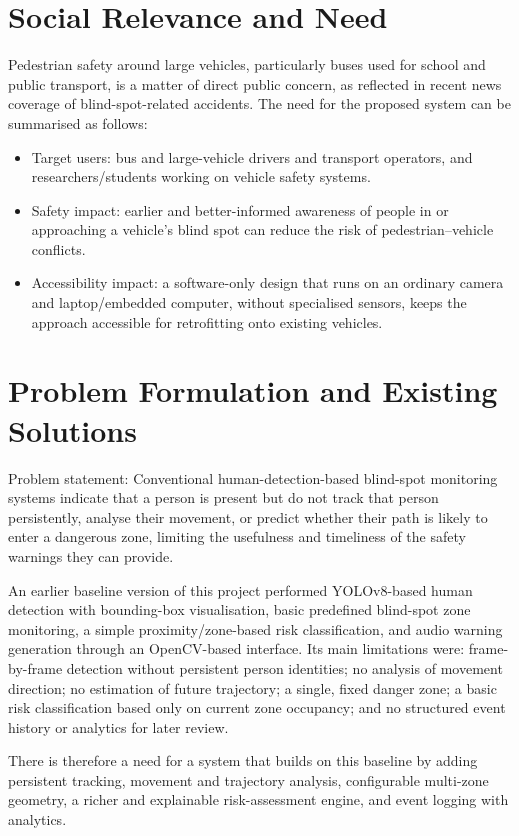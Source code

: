 \documentclass[12pt,a4paper]{report}
\begin{document}
\section{Social Relevance and Need}
Pedestrian safety around large vehicles, particularly buses used for school and public transport, is a matter of direct public concern, as reflected in recent news coverage of blind-spot-related accidents. The need for the proposed system can be summarised as follows:
\begin{itemize}[leftmargin=*,itemsep=2pt]
\item Target users: bus and large-vehicle drivers and transport operators, and researchers/students working on vehicle safety systems.
\item Safety impact: earlier and better-informed awareness of people in or approaching a vehicle's blind spot can reduce the risk of pedestrian--vehicle conflicts.
\item Accessibility impact: a software-only design that runs on an ordinary camera and laptop/embedded computer, without specialised sensors, keeps the approach accessible for retrofitting onto existing vehicles.
\end{itemize}

\section{Problem Formulation and Existing Solutions}
Problem statement: Conventional human-detection-based blind-spot monitoring systems indicate that a person is present but do not track that person persistently, analyse their movement, or predict whether their path is likely to enter a dangerous zone, limiting the usefulness and timeliness of the safety warnings they can provide.

An earlier baseline version of this project performed YOLOv8-based human detection with bounding-box visualisation, basic predefined blind-spot zone monitoring, a simple proximity/zone-based risk classification, and audio warning generation through an OpenCV-based interface. Its main limitations were: frame-by-frame detection without persistent person identities; no analysis of movement direction; no estimation of future trajectory; a single, fixed danger zone; a basic risk classification based only on current zone occupancy; and no structured event history or analytics for later review.

There is therefore a need for a system that builds on this baseline by adding persistent tracking, movement and trajectory analysis, configurable multi-zone geometry, a richer and explainable risk-assessment engine, and event logging with analytics.
\end{document}
